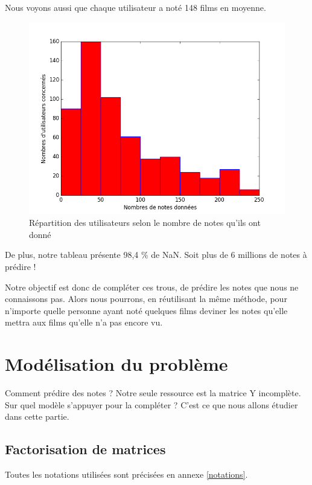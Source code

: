 \documentclass[a4paper,10pt]{article}
\begin{document}
Nous voyons aussi que chaque utilisateur a noté 148 films en moyenne.

\begin{figure}[H]
  \centering
\includegraphics[scale=0.5]{hist1.png}
\caption{Répartition des utilisateurs selon le nombre de notes qu'ils ont donné}
\end{figure}

De plus, notre tableau présente 98,4 \% de NaN. Soit plus de 6 millions de notes à prédire !

Notre objectif est donc de compléter ces trous, de prédire les notes que nous ne connaissons pas. Alors nous pourrons, en réutilisant la même méthode, pour n'importe quelle personne ayant noté quelques 
films deviner les notes qu'elle mettra aux films qu'elle n'a pas encore vu.

\section{Modélisation du problème}

Comment prédire des notes ?
Notre seule ressource est la matrice Y incomplète. Sur quel modèle s'appuyer pour la compléter ?
C'est ce que nous allons étudier dans cette partie.

\subsection{Factorisation de matrices}

Toutes les notations utilisées sont précisées en annexe \ref{notations}.\\
\end{document}
